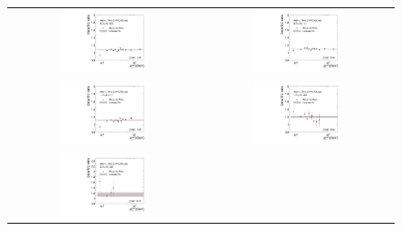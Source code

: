 \begin{figure}[!htp]
  \centering
  \begin{tabular}{cc}
                \includegraphics[width=0.49\textwidth]{figures/ExtrapolRatio_Eta0_with_pli_final_nominal_v4b.pdf} &
                \includegraphics[width=0.49\textwidth]{figures/ExtrapolRatio_Eta1_with_pli_final_nominal_v4b.pdf} \\
                \includegraphics[width=0.49\textwidth]{figures/ExtrapolRatio_Eta2_with_pli_final_nominal_v4b.pdf} &
                \includegraphics[width=0.49\textwidth]{figures/ExtrapolRatio_Eta3_with_pli_final_nominal_v4b.pdf} \\
                \includegraphics[width=0.49\textwidth]{figures/ExtrapolRatio_Eta4_with_pli_final_nominal_v4b.pdf}

\end{tabular}
\end{figure}
